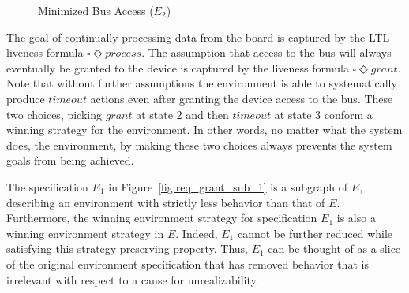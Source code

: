 \begin{figure}[bt]
\centering
\SmallPicture
{}
\caption{Minimized Bus Access ($E_2$)}
\label{fig:req_grant_sub_2}
\MediumPicture
\end{figure}


The goal of continually processing data from the board is captured
by the LTL liveness formula $\square\Diamond process$.  The assumption
that access to the bus will always eventually be granted to the device
is captured by the liveness formula $\square\Diamond grant$.
 Note that without further assumptions the environment is able to
 systematically produce $timeout$ actions even after granting the device access
 to the bus.  These two choices, picking $grant$ at state 2 and then
 $timeout$ at state 3 conform a winning strategy for the environment. In other
 words, no matter what the system does, the environment, by making these two
 choices always prevents the system goals from being achieved.
 
The  specification $E_{1}$ in Figure~\ref{fig:req_grant_sub_1} is a subgraph of $E$, describing an environment with strictly less behavior than that of $E$. Furthermore, the winning environment strategy for specification $E_1$ is also a winning environment strategy in $E$. Indeed,  $E_1$ cannot be further reduced while satisfying this strategy preserving property. Thus, $E_1$ can be thought of as a slice of the original environment specification that has removed behavior that is irrelevant with respect to a cause for unrealizability.

